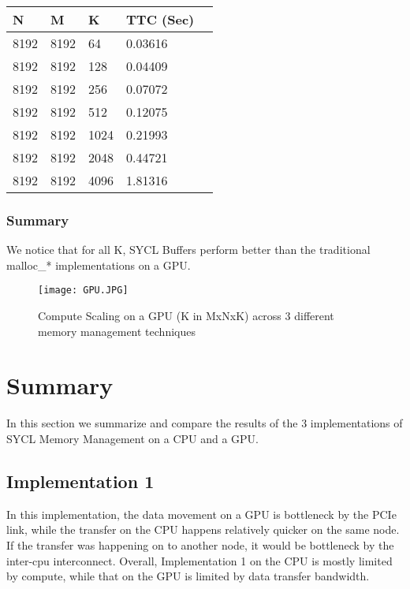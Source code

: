 \documentclass[14pt,fleqn]{article}
\begin{document}
\begin{center}
\begin{tabular}{|l|l|l|l|l|}                                   
    \hline\hline         
    N  & M & K & TTC (Sec) \\
    \hline\hline
    8192 & 8192 & 64 & 0.03616 \\ \hline
    8192 & 8192 & 128 & 0.04409 \\ \hline
    8192 & 8192 & 256 & 0.07072 \\ \hline
    8192 & 8192 & 512 & 0.12075 \\ \hline
    8192 & 8192 & 1024 & 0.21993 \\ \hline
    8192 & 8192 & 2048 & 0.44721 \\ \hline
    8192 & 8192 & 4096 & 1.81316 \\ \hline

\end{tabular}
\end{center}

\subsubsection{Summary}
We notice that for all K, SYCL Buffers perform better than the traditional malloc\_* implementations on a GPU.\\  

\begin{figure}
\centering
\texttt{[image: GPU.JPG]}
\caption{Compute Scaling on a GPU (K in MxNxK) across 3 different memory management techniques}
\end{figure}

\section{Summary}
In this section we summarize and compare the results of the 3 implementations of SYCL Memory Management on a CPU and a GPU. 

\subsection{Implementation 1}
In this implementation, the data movement on a GPU is bottleneck by the PCIe link, while the transfer on the CPU happens relatively quicker on the same node. If the transfer was happening on to another node, it would be bottleneck by the inter-cpu interconnect.
Overall, Implementation 1 on the CPU is mostly limited by compute, while that on the GPU is limited by data transfer bandwidth.
\end{document}
